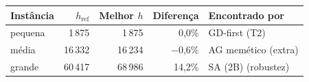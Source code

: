\begin{tabular}{lrrrl}
\toprule
Instância & $h_{\mathrm{ref}}$ & Melhor $h$ & Diferença & Encontrado por \\
\midrule
pequena & 1\,875 & 1\,875 & 0,0\% & GD-first (T2) \\
média & 16\,332 & 16\,234 & $-$0,6\% & AG memético (extra) \\
grande & 60\,417 & 68\,986 & 14,2\% & SA (2B) (robustez) \\
\bottomrule
\end{tabular}
